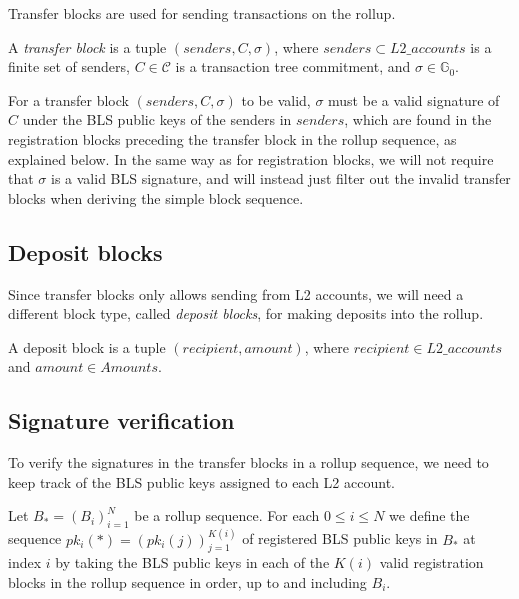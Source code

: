 Transfer blocks are used for sending transactions on the rollup.

\begin{defn}
  A \emph{transfer block} is a tuple \((senders, C, \sigma)\), where \(senders \subset L2\_accounts\) is a finite set of senders, \(C \in \mathcal{C}\) is a transaction tree commitment, and \(\sigma \in \mathbb{G}_0\).
\end{defn}

For a transfer block \((senders, C, \sigma)\) to be valid, \(\sigma\) must be a valid signature of \(C\) under the BLS public keys of the senders in \(senders\), which are found in the registration blocks preceding the transfer block in the rollup sequence, as explained below. In the same way as for registration blocks, we will not require that \(\sigma\) is a valid BLS signature, and will instead just filter out the invalid transfer blocks when deriving the simple block sequence.

\subsection{Deposit blocks}

Since transfer blocks only allows sending from L2 accounts, we will need a different block type, called \emph{deposit blocks}, for making deposits into the rollup.

\begin{defn}
A deposit block is a tuple \((recipient, amount)\), where \(recipient \in L2\_accounts\) and \(amount \in Amounts\).
\end{defn}

\subsection{Signature verification}

To verify the signatures in the transfer blocks in a rollup sequence, we need to keep track of the BLS public keys assigned to each L2 account.

\begin{defn}
  Let \(B_* = (B_i)_{i=1}^N\) be a rollup sequence. For each \(0 \leq i \leq N\) we define the sequence \(pk_i(*) = (pk_i(j))_{j=1}^{K(i)}\) of registered BLS public keys in \(B_*\) at index \(i\) by taking the BLS public keys in each of the \(K(i)\) valid registration blocks in the rollup sequence in order, up to and including \(B_i\).
\end{defn}

